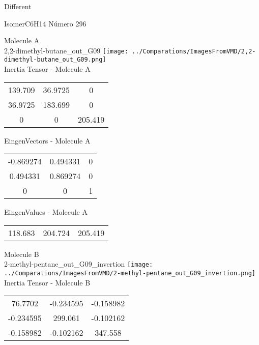 \begin{center}
\vtab
\vtab
\textcolor{NavyBlue}{\Large Different}
\end{center}

 \newpage

\vtab[-2cm]
\begin{center}
{\large IsomerC6H14 \tab Número 296}
\end{center}
\begin{multicols}{2}
\begin{center}

Molecule A \\ 
2,2-dimethyl-butane\_out\_G09
\texttt{[image: ../Comparations/ImagesFromVMD/2,2-dimethyl-butane\_out\_G09.png]}
\\
Inertia Tensor - Molecule A \\
\vtab

\begin{tabular}{|c c c|}
139.709	 & 	36.9725	 & 	0	 \\
36.9725	 & 	183.699	 & 	0	 \\
0	 & 	0	 & 	205.419
\end{tabular}

\vtab
 EingenVectors - Molecule A     \\
\vtab
\begin{tabular}{|c c c|}
-0.869274	 & 	0.494331	 & 	0	 \\
0.494331	 & 	0.869274	 & 	0	 \\
0	 & 	0	 & 	1
\end{tabular}

\vtab
 EingenValues - Molecule A     \\
\vtab
\begin{tabular}{|c c c|}
118.683	 & 	204.724	 & 	205.419	 \\
\end{tabular}
\columnbreak

Molecule B \\ 
2-methyl-pentane\_out\_G09\_invertion
\texttt{[image: ../Comparations/ImagesFromVMD/2-methyl-pentane\_out\_G09\_invertion.png]}
\\
Inertia Tensor - Molecule B \\
\vtab

\begin{tabular}{|c c c|}
76.7702	 & 	-0.234595	 & 	-0.158982	 \\
-0.234595	 & 	299.061	 & 	-0.102162	 \\
-0.158982	 & 	-0.102162	 & 	347.558
\end{tabular}


\end{center}
\end{multicols}
